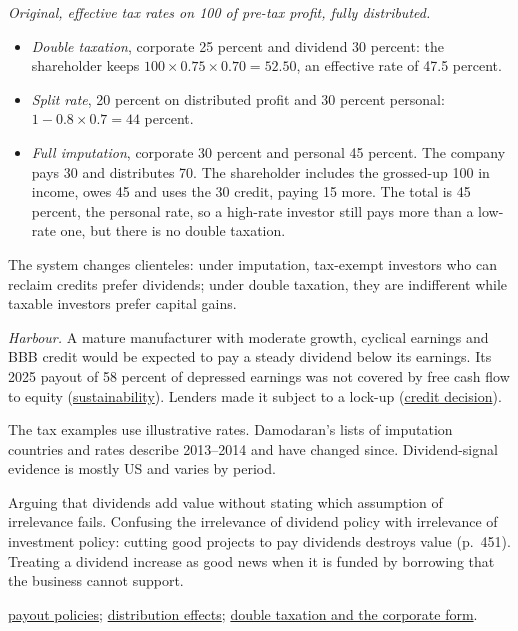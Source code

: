 \begin{qfmethod}
 \emph{Original, effective tax rates on 100 of pre-tax profit, fully distributed.}
\begin{itemize}
\item \emph{Double taxation}, corporate 25 percent and dividend 30 percent: the shareholder keeps $100\times0.75\times0.70=52.50$, an effective rate of 47.5 percent.
\item \emph{Split rate}, 20 percent on distributed profit and 30 percent personal: $1-0.8\times0.7=44$ percent.
\item \emph{Full imputation}, corporate 30 percent and personal 45 percent. The company pays 30 and distributes 70. The shareholder includes the grossed-up 100 in income, owes 45 and uses the 30 credit, paying 15 more. The total is 45 percent, the personal rate, so a high-rate investor still pays more than a low-rate one, but there is no double taxation.
\end{itemize}
The system changes clienteles: under imputation, tax-exempt investors who can reclaim credits prefer dividends; under double taxation, they are indifferent while taxable investors prefer capital gains.

\emph{Harbour.} A mature manufacturer with moderate growth, cyclical earnings and BBB credit would be expected to pay a steady dividend below its earnings. Its 2025 payout of 58 percent of depressed earnings was not covered by free cash flow to equity (\hyperref[meth:dividend-sustainability]{sustainability}). Lenders made it subject to a lock-up (\hyperref[ex:integrated-credit-decision]{credit decision}).

 The tax examples use illustrative rates. Damodaran's lists of imputation countries and rates describe 2013--2014 and have changed since. Dividend-signal evidence is mostly US and varies by period.

 Arguing that dividends add value without stating which assumption of irrelevance fails. Confusing the irrelevance of dividend policy with irrelevance of investment policy: cutting good projects to pay dividends destroys value (p.~451). Treating a dividend increase as good news when it is funded by borrowing that the business cannot support.

 \hyperref[meth:payout-policy-comparison]{payout policies}; \hyperref[meth:distribution-effects]{distribution effects}; \hyperref[def:organisational-forms-issuers]{double taxation and the corporate form}.

\end{qfmethod}

